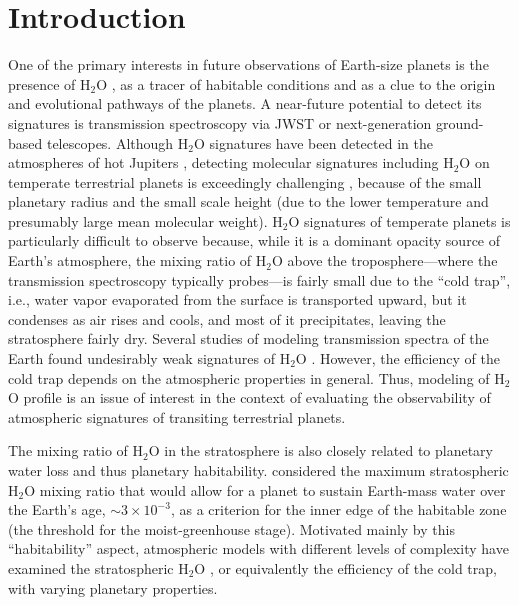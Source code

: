 \documentclass[11pt,numberedappendix,twocolappendix,]{emulateapj}
\def\water{H$_2$O }
\begin{document}

\section{Introduction}
\label{s:intro}

One of the primary interests in future observations of Earth-size planets is the presence of \water, as a tracer of habitable conditions and as a clue to the origin and evolutional pathways of the planets. 
A near-future potential to detect its signatures is transmission spectroscopy via JWST or next-generation ground-based telescopes. 
%
Although \water signatures have been detected in the atmospheres of hot Jupiters \citep[e.g.,][]{Sing2016}, detecting molecular signatures including \water on temperate terrestrial planets is exceedingly challenging \citep{Cowan2015}, 
because of the small planetary radius and the small scale height (due to the lower temperature and presumably large mean molecular weight).  
\water signatures of temperate planets is particularly difficult to observe because, while it is a dominant opacity source of Earth's atmosphere, the mixing ratio of \water above the troposphere---where the transmission spectroscopy typically probes---is fairly small due to the ``cold trap'', i.e., water vapor evaporated from the surface is transported upward, but it condenses as air rises and cools, and most of it precipitates, leaving the stratosphere fairly dry. 
Several studies of modeling transmission spectra of the Earth found  undesirably weak signatures of \water \citep[e.g.,][]{Ehrenreich2006, Kaltenegger2009, Betremieux2013, Misra2014}. 
However, the efficiency of the cold trap depends on the atmospheric properties in general. 
Thus, modeling of \water profile is an issue of interest in the context of  evaluating the observability of atmospheric signatures of transiting terrestrial planets. 

The mixing ratio of \water in the stratosphere is also closely related to planetary water loss and thus planetary habitability. 
\citet{Kasting1993} considered the maximum stratospheric \water mixing ratio that would allow for a planet to sustain Earth-mass water over the Earth's age, $\sim 3 \times 10^{-3}$, as a criterion for the inner edge of the habitable zone (the threshold for the moist-greenhouse stage). 
Motivated mainly by this ``habitability'' aspect, atmospheric models with different levels of complexity have examined the stratospheric \water, or equivalently the efficiency of the cold trap, with varying planetary properties. 
\end{document}
